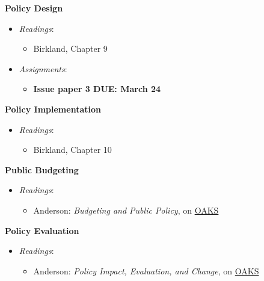 \week \textbf{Policy Design}

\begin{itemize}

\item
  \emph{Readings}:

  \begin{itemize}
  
  \item
    Birkland, Chapter 9
  \end{itemize}
\item
  \emph{Assignments}:

  \begin{itemize}
  
  \item
    \textbf{Issue paper 3 DUE: March 24}
  \end{itemize}
\end{itemize}

\week \textbf{Policy Implementation}

\begin{itemize}

\item
  \emph{Readings}:

  \begin{itemize}
  
  \item
    Birkland, Chapter 10
  \end{itemize}
\end{itemize}

\week \textbf{Public Budgeting}

\begin{itemize}

\item
  \emph{Readings}:

  \begin{itemize}
  
  \item
    Anderson: \emph{Budgeting and Public Policy}, on
    \href{https://lms.cofc.edu/d2l/login}{OAKS}
  \end{itemize}
\end{itemize}

\week \textbf{Policy Evaluation}

\begin{itemize}

\item
  \emph{Readings}:

  \begin{itemize}
  
  \item
    Anderson: \emph{Policy Impact, Evaluation, and Change}, on
    \href{https://lms.cofc.edu/d2l/login}{OAKS}
  \end{itemize}
\end{itemize}


